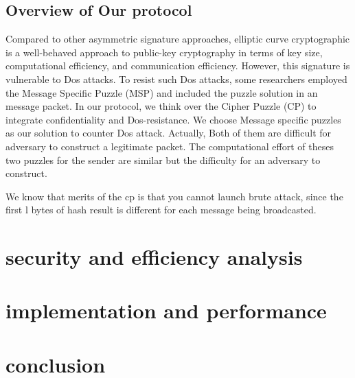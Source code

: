 \documentclass[lnicst,sechang,a4paper]{svmultln}
\begin{document}
\subsection{ Overview of Our protocol}
Compared to other asymmetric signature approaches, elliptic curve cryptographic is a well-behaved approach to public-key cryptography in terms of key size, computational efficiency, and communication efficiency. However, this signature is vulnerable to Dos attacks. To resist such Dos attacks, some researchers employed the Message Specific Puzzle (MSP) and included the puzzle solution in an message packet. In our protocol, we think over the Cipher Puzzle (CP) to integrate confidentiality and Dos-resistance. We choose Message specific puzzles as our solution to counter Dos attack. Actually, Both of them are difficult for adversary to construct a legitimate packet.  The computational effort of theses two puzzles for the sender are similar but the difficulty for an adversary to construct.

We know that merits of the cp is that you cannot launch brute attack, since the first l bytes of hash result is different for each message being broadcasted. 


\section{security and efficiency analysis}

\section{implementation and performance}
\section{conclusion}
\end{document}

